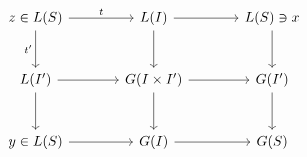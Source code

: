 \[\begin{tikzcd}[column sep=large,row sep=large]
z\in L(S) \arrow[r,"t"] \arrow[d,"t'"'] & L(I) \arrow[r] \arrow[d] & L(S)\ni x \arrow[d]\\
L(I') \arrow[r] \arrow[d] & G(I\times I') \arrow[r] \arrow[d] & G(I') \arrow[d]\\
y\in L(S) \arrow[r] & G(I) \arrow[r] & G(S)
\end{tikzcd}\]
